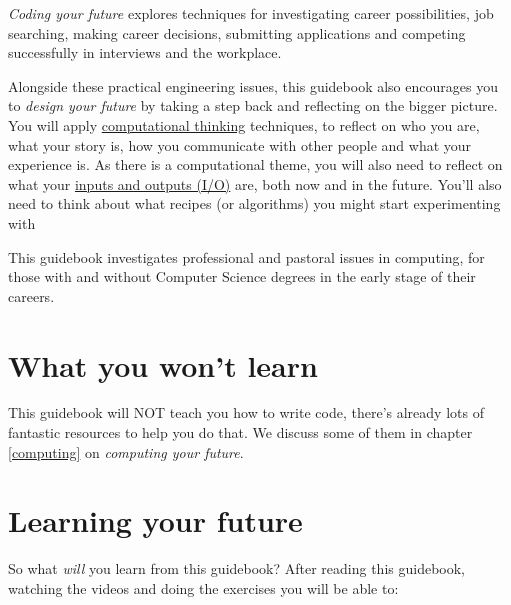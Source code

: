 \documentclass[
]{book}
\begin{document}
\emph{Coding your future} explores techniques for investigating career possibilities, job searching, making career decisions, submitting applications and competing successfully in interviews and the workplace.

Alongside these practical engineering issues, this guidebook also encourages you to \emph{design your future} by taking a step back and reflecting on the bigger picture. You will apply \href{https://en.wikipedia.org/wiki/Computational_thinking}{computational thinking} techniques, to reflect on who you are, what your story is, how you communicate with other people and what your experience is. As there is a computational theme, you will also need to reflect on what your \href{https://en.wikipedia.org/wiki/Input/output}{inputs and outputs (I/O)} are, both now and in the future. You'll also need to think about what recipes (or algorithms) you might start experimenting with

This guidebook investigates professional and pastoral issues in computing, for those with and without Computer Science degrees in the early stage of their careers.

\hypertarget{nilo}{%
\section{What you won't learn}\label{nilo}}

This guidebook will NOT teach you how to write code, there's already lots of fantastic resources to help you do that. We discuss some of them in chapter \ref{computing} on \emph{computing your future}.

\hypertarget{bilo}{%
\section{Learning your future}\label{bilo}}

So what \emph{will} you learn from this guidebook? After reading this guidebook, watching the videos and doing the exercises you will be able to:
\end{document}

